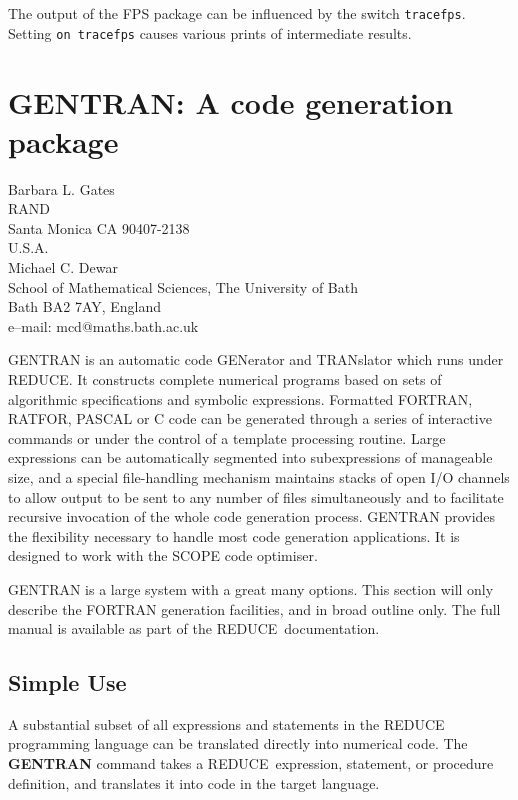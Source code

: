 \documentclass[11pt,letterpaper]{book}
\makeatletter
\newcommand{\REDUCE}{REDUCE}
\newcommand{\underscore}{\_}
\newcommand{\ttindex}[1]{{\renewcommand{\_}{\protect\underscore}%
                          \index{#1@{\tt #1}}}}
\makeatother
\begin{document}
The output of the FPS package can be influenced by the\ttindex{TRACEFPS}
switch {\tt tracefps}.  Setting {\tt on tracefps} causes various
prints of intermediate results.

\chapter{GENTRAN: A code generation package}
\label{GENTRAN}

{\footnotesize
\begin{center}
Barbara L. Gates \\
RAND \\
Santa Monica CA 90407-2138 \\
U.S.A. \\[0.1in]
Michael C. Dewar \\
School of Mathematical Sciences, The University of Bath \\
Bath BA2 7AY, England \\[0.05in]
e--mail: mcd@maths.bath.ac.uk
\end{center}
}

\ttindex{GENTRAN}

GENTRAN is an automatic code GENerator and TRANslator which runs under
\REDUCE.  It constructs complete numerical programs based on sets of
algorithmic specifications and symbolic expressions.  Formatted
FORTRAN, RATFOR, PASCAL or C code can be generated through a series of
interactive commands or under the control of a template processing
routine.  Large expressions can be automatically segmented into
subexpressions of manageable size, and a special file-handling
mechanism maintains stacks of open I/O channels to allow output to be
sent to any number of files simultaneously and to facilitate recursive
invocation of the whole code generation process.  GENTRAN provides the
flexibility necessary to handle most code generation applications.  It
is designed to work with the SCOPE code optimiser.

GENTRAN is a large system with a great many options.  This section
will only describe the FORTRAN generation facilities, and in broad
outline only.  The full manual is available as part of the \REDUCE\
documentation.

\section{Simple Use}

A substantial subset of all expressions and statements in the \REDUCE{}
programming language can be translated directly into numerical code.
The {\bf GENTRAN} command takes a \REDUCE\ expression, statement, or
procedure definition, and translates it into code in the target
language.
\end{document}
